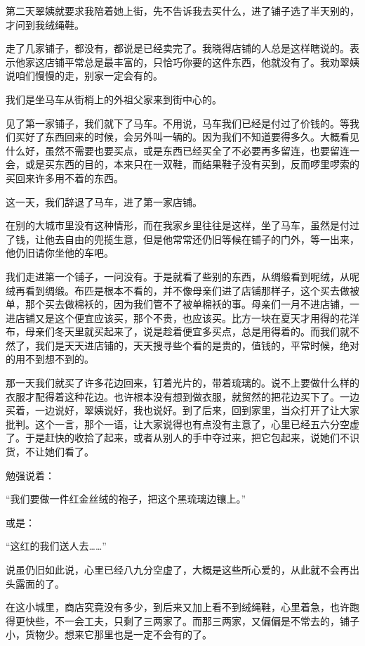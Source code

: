 \par 第二天翠姨就要求我陪着她上街，先不告诉我去买什么，进了铺子选了半天别的，才问到我绒绳鞋。
\par 走了几家铺子，都没有，都说是已经卖完了。我晓得店铺的人总是这样瞎说的。表示他家这店铺平常总是最丰富的，只恰巧你要的这件东西，他就没有了。我劝翠姨说咱们慢慢的走，别家一定会有的。
\par 我们是坐马车从街梢上的外祖父家来到街中心的。
\par 见了第一家铺子，我们就下了马车。不用说，马车我们已经是付过了价钱的。等我们买好了东西回来的时候，会另外叫一辆的。因为我们不知道要得多久。大概看见什么好，虽然不需要也要买点，或是东西已经买全了不必要再多留连，也要留连一会，或是买东西的目的，本来只在一双鞋，而结果鞋子没有买到，反而啰里啰索的买回来许多用不着的东西。
\par 这一天，我们辞退了马车，进了第一家店铺。
\par 在别的大城市里没有这种情形，而在我家乡里往往是这样，坐了马车，虽然是付过了钱，让他去自由的兜揽生意，但是他常常还仍旧等候在铺子的门外，等一出来，他仍旧请你坐他的车吧。
\par 我们走进第一个铺子，一问没有。于是就看了些别的东西，从绸缎看到呢绒，从呢绒再看到绸缎。布匹是根本不看的，并不像母亲们进了店铺那样子，这个买去做被单，那个买去做棉袄的，因为我们管不了被单棉袄的事。母亲们一月不进店铺，一进店铺又是这个便宜应该买，那个不贵，也应该买。比方一块在夏天才用得的花洋布，母亲们冬天里就买起来了，说是趁着便宜多买点，总是用得着的。而我们就不然了，我们是天天进店铺的，天天搜寻些个看的是贵的，值钱的，平常时候，绝对的用不到想不到的。
\par 那一天我们就买了许多花边回来，钉着光片的，带着琉璃的。说不上要做什么样的衣服才配得着这种花边。也许根本没有想到做衣服，就贸然的把花边买下了。一边买着，一边说好，翠姨说好，我也说好。到了后来，回到家里，当众打开了让大家批判。这个一言，那个一语，让大家说得也有点没有主意了，心里已经五六分空虚了。于是赶快的收拾了起来，或者从别人的手中夺过来，把它包起来，说她们不识货，不让她们看了。
\par 勉强说着：
\par “我们要做一件红金丝绒的袍子，把这个黑琉璃边镶上。”
\par 或是：
\par “这红的我们送人去……”
\par 说虽仍旧如此说，心里已经八九分空虚了，大概是这些所心爱的，从此就不会再出头露面的了。
\par 在这小城里，商店究竟没有多少，到后来又加上看不到绒绳鞋，心里着急，也许跑得更快些，不一会工夫，只剩了三两家了。而那三两家，又偏偏是不常去的，铺子小，货物少。想来它那里也是一定不会有的了。
